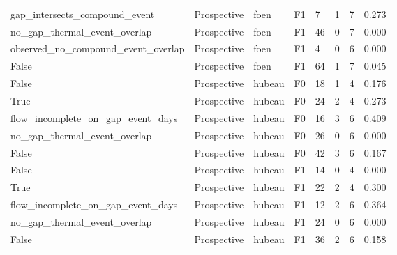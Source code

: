 {\begin{longtable}{p{}p{}p{}p{}p{}p{}p{}p{}}
gap\_\allowbreak intersects\_\allowbreak compound\_\allowbreak event & Prospective & foen & F1 & 7 & 1 & 7 & 0.273 \\
no\_\allowbreak gap\_\allowbreak thermal\_\allowbreak event\_\allowbreak overlap & Prospective & foen & F1 & 46 & 0 & 7 & 0.000 \\
observed\_\allowbreak no\_\allowbreak compound\_\allowbreak event\_\allowbreak overlap & Prospective & foen & F1 & 4 & 0 & 6 & 0.000 \\
False & Prospective & foen & F1 & 64 & 1 & 7 & 0.045 \\
False & Prospective & hubeau & F0 & 18 & 1 & 4 & 0.176 \\
True & Prospective & hubeau & F0 & 24 & 2 & 4 & 0.273 \\
flow\_\allowbreak incomplete\_\allowbreak on\_\allowbreak gap\_\allowbreak event\_\allowbreak days & Prospective & hubeau & F0 & 16 & 3 & 6 & 0.409 \\
no\_\allowbreak gap\_\allowbreak thermal\_\allowbreak event\_\allowbreak overlap & Prospective & hubeau & F0 & 26 & 0 & 6 & 0.000 \\
False & Prospective & hubeau & F0 & 42 & 3 & 6 & 0.167 \\
False & Prospective & hubeau & F1 & 14 & 0 & 4 & 0.000 \\
True & Prospective & hubeau & F1 & 22 & 2 & 4 & 0.300 \\
flow\_\allowbreak incomplete\_\allowbreak on\_\allowbreak gap\_\allowbreak event\_\allowbreak days & Prospective & hubeau & F1 & 12 & 2 & 6 & 0.364 \\
no\_\allowbreak gap\_\allowbreak thermal\_\allowbreak event\_\allowbreak overlap & Prospective & hubeau & F1 & 24 & 0 & 6 & 0.000 \\
False & Prospective & hubeau & F1 & 36 & 2 & 6 & 0.158 \\
\bottomrule
\end{longtable}
}

